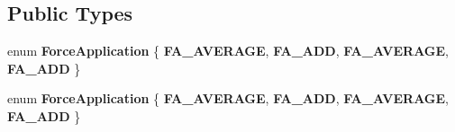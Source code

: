 \subsection*{Public Types}
\begin{DoxyCompactItemize}
\item 
\mbox{\label{classPUBaseForceAffector_a7be2d17fb8ba0d482705d4846018497b}} 
enum {\bfseries Force\+Application} \{ {\bfseries F\+A\+\_\+\+A\+V\+E\+R\+A\+GE}, 
{\bfseries F\+A\+\_\+\+A\+DD}, 
{\bfseries F\+A\+\_\+\+A\+V\+E\+R\+A\+GE}, 
{\bfseries F\+A\+\_\+\+A\+DD}
 \}
\item 
\mbox{\label{classPUBaseForceAffector_a7be2d17fb8ba0d482705d4846018497b}} 
enum {\bfseries Force\+Application} \{ {\bfseries F\+A\+\_\+\+A\+V\+E\+R\+A\+GE}, 
{\bfseries F\+A\+\_\+\+A\+DD}, 
{\bfseries F\+A\+\_\+\+A\+V\+E\+R\+A\+GE}, 
{\bfseries F\+A\+\_\+\+A\+DD}
 \}
\end{DoxyCompactItemize}
